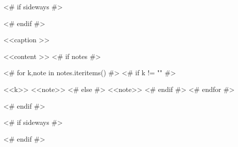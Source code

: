 \begin{<< env  >>}
  \centering

  <# if sideways #>
  \begin{adjustbox}{angle=90}
  <# endif #>
  \begin{threeparttable}
    \caption{<<caption >>}
    <<content >>
    <# if notes #>
    \begin{tablenotes}
      <# for k,note in notes.iteritems() #>
      <# if k != "" #>
      \item [<<k>>] <<note>>
      <# else #>
      <<note>>
      <# endif #>
      <# endfor #>
    \end{tablenotes}
    <# endif #>
  \end{threeparttable}
  <# if sideways #>
  \end{adjustbox}
  <# endif #>
  \label{tab:<<label >>}
\end{<< env  >>}

